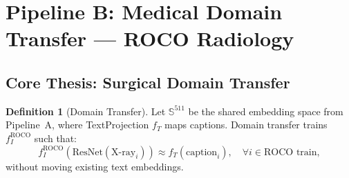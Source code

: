 \documentclass[12pt,a4paper]{article}
\theoremstyle{definition}
\newtheorem{definition}{Definition}[section]
\theoremstyle{plain}
\theoremstyle{remark}
\newcommand{\Sph}{\mathbb{S}}
\begin{document}
\newpage
\section{Pipeline B: Medical Domain Transfer --- ROCO Radiology}
\label{sec:pipelineB}

\subsection{Core Thesis: Surgical Domain Transfer}

\begin{definition}[Domain Transfer]
Let $\Sph^{511}$ be the shared embedding space from Pipeline~A, where TextProjection $f_T$ maps captions. Domain transfer trains $f_I^{\text{ROCO}}$ such that:
\[
  f_I^{\text{ROCO}}\!\left(\text{ResNet}(\text{X-ray}_i)\right) \approx f_T(\text{caption}_i), \quad \forall i \in \text{ROCO train},
\]
without moving existing text embeddings.
\end{definition}
\end{document}
